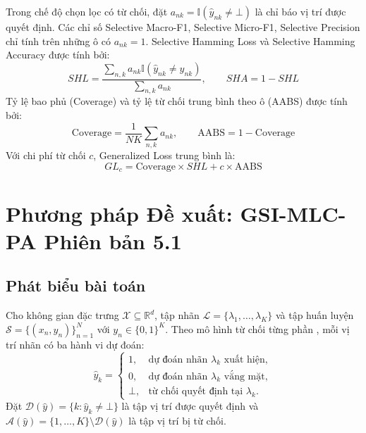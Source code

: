 \documentclass[11pt,a4paper]{article}
\begin{document}
Trong chế độ chọn lọc có từ chối, đặt $a_{nk} = \mathbb{I}(\hat{y}_{nk} \neq \bot)$ là chỉ báo vị trí được quyết định. Các chỉ số Selective Macro-F1, Selective Micro-F1, Selective Precision chỉ tính trên những ô có $a_{nk} = 1$. Selective Hamming Loss và Selective Hamming Accuracy được tính bởi:
\begin{equation}
SHL = \frac{\sum_{n,k} a_{nk} \mathbb{I}(\hat{y}_{nk} \neq y_{nk})}{\sum_{n,k} a_{nk}}, \qquad SHA = 1 - SHL
\end{equation}
Tỷ lệ bao phủ (Coverage) và tỷ lệ từ chối trung bình theo ô (AABS) được tính bởi:
\begin{equation}
\text{Coverage} = \frac{1}{NK} \sum_{n,k} a_{nk}, \qquad \text{AABS} = 1 - \text{Coverage}
\end{equation}
Với chi phí từ chối $c$, Generalized Loss trung bình là:
\begin{equation}
GL_c = \text{Coverage} \times SHL + c \times \text{AABS}
\end{equation}

\section{Phương pháp Đề xuất: GSI-MLC-PA Phiên bản 5.1}
\label{sec:methodology}

\subsection{Phát biểu bài toán}
Cho không gian đặc trưng $\mathcal{X} \subseteq \mathbb{R}^d$, tập nhãn $\mathcal{L} = \{\lambda_1, \dots, \lambda_K\}$ và tập huấn luyện $\mathcal{S} = \{(x_n, y_n)\}_{n=1}^N$ với $y_n \in \{0, 1\}^K$. Theo mô hình từ chối từng phần \cite{nguyen2020reliable, nguyen2021multilabel}, mỗi vị trí nhãn có ba hành vi dự đoán:
\begin{equation}
\hat{y}_k = 
\begin{cases}
1, & \text{dự đoán nhãn } \lambda_k \text{ xuất hiện}, \\
0, & \text{dự đoán nhãn } \lambda_k \text{ vắng mặt}, \\
\bot, & \text{từ chối quyết định tại } \lambda_k.
\end{cases}
\label{eq:ternary_action}
\end{equation}
Đặt $\mathcal{D}(\hat{y}) = \{k : \hat{y}_k \neq \bot\}$ là tập vị trí được quyết định và $\mathcal{A}(\hat{y}) = \{1, \dots, K\} \setminus \mathcal{D}(\hat{y})$ là tập vị trí bị từ chối.
\end{document}
